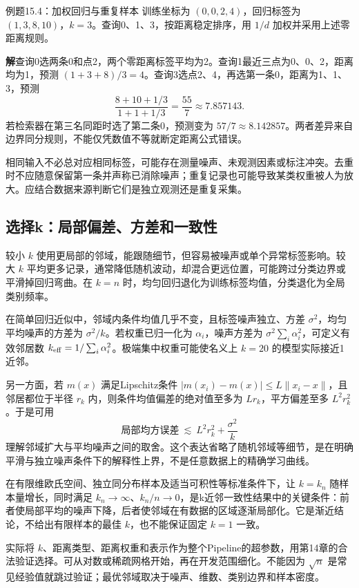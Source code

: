 \documentclass[UTF8,fontset=none,zihao=-4,a4paper]{ctexart}
\newcommand{\sol}{\par\noindent\textbf{解}\quad}
\numberwithin{equation}{section}
\numberwithin{figure}{section}
\begin{document}
\begin{infobox}[unbreakable]{例题15.4：加权回归与重复样本}
训练坐标为 $(0,0,2,4)$，回归标签为 $(1,3,8,10)$，$k=3$。查询0、1、3，按距离稳定排序，用 $1/d$ 加权并采用上述零距离规则。
\sol 查询0选两条0和点2，两个零距离标签平均为2。查询1最近三点为0、0、2，距离均为1，预测 $(1+3+8)/3=4$。查询3选点2、4，再选第一条0，距离为1、1、3，预测
\[
 \frac{8+10+1/3}{1+1+1/3}=\frac{55}{7}\approx7.857143.
\]
若检索器在第三名同距时选了第二条0，预测变为 $57/7\approx8.142857$。两者差异来自边界同分规则，不能仅凭数值不等就断定距离公式错误。
\end{infobox}
相同输入不必总对应相同标签，可能存在测量噪声、未观测因素或标注冲突。去重时不应随意保留第一条并声称已消除噪声；重复记录也可能导致某类权重被人为放大。应结合数据来源判断它们是独立观测还是重复采集。

\subsection{选择k：局部偏差、方差和一致性}
较小 $k$ 使用更局部的邻域，能跟随细节，但容易被噪声或单个异常标签影响。较大 $k$ 平均更多记录，通常降低随机波动，却混合更远位置，可能跨过分类边界或平滑掉回归弯曲。在 $k=n$ 时，均匀回归退化为训练标签均值，分类退化为全局类别频率。

在简单回归近似中，邻域内条件均值几乎不变，且标签噪声独立、方差 $\sigma^2$，均匀平均噪声的方差为 $\sigma^2/k$。若权重已归一化为 $\alpha_i$，噪声方差为 $\sigma^2\sum_i\alpha_i^2$，可定义有效邻居数 $k_{\rm eff}=1/\sum_i\alpha_i^2$。极端集中权重可能使名义上 $k=20$ 的模型实际接近1近邻。

另一方面，若 $m(x)$ 满足Lipschitz条件 $|m(x_i)-m(x)|\le L\|x_i-x\|$，且邻居都位于半径 $r_k$ 内，则条件均值偏差的绝对值至多为 $Lr_k$，平方偏差至多 $L^2r_k^2$。于是可用
\[
 \text{局部均方误差}\ \lesssim\ L^2r_k^2+\frac{\sigma^2}{k}
\]
理解邻域扩大与平均噪声之间的取舍。这个表达省略了随机邻域等细节，是在明确平滑与独立噪声条件下的解释性上界，不是任意数据上的精确学习曲线。

在有限维欧氏空间、独立同分布样本及适当可积性等标准条件下，让 $k=k_n$ 随样本量增长，同时满足 $k_n\to\infty$、$k_n/n\to0$，是k近邻一致性结果中的关键条件：前者使局部平均的噪声下降，后者使邻域在有数据的区域逐渐局部化。它是渐近结论，不给出有限样本的最佳 $k$，也不能保证固定 $k=1$ 一致。

实际将 $k$、距离类型、距离权重和表示作为整个Pipeline的超参数，用第14章的合法验证选择。可从对数或稀疏网格开始，再在开发范围细化。不能因为 $\sqrt n$ 是常见经验值就跳过验证；最优邻域取决于噪声、维数、类别边界和样本密度。
\end{document}
